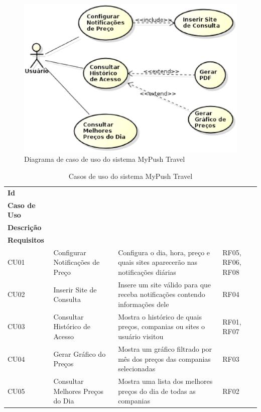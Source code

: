 \begin{figure}[H]
	\centering
	\includegraphics[scale=0.5]{figuras/caso_de_uso_mypush.eps}
	\caption{Diagrama de caso de uso do sistema MyPush Travel}
\end{figure}

\begin{table}[H]
	\centering
	\begin{tabular}{llll}
		\toprule
			\textbf{Id} & \\
			\textbf{Caso de Uso} & \\
			\textbf{Descrição} & \\
			\textbf{Requisitos} \\
		\midrule
			CU01 & Configurar Notificações de Preço & Configura o dia, hora, preço e quais sites aparecerão nas notificações diárias & RF05, RF06, RF08 \\ \hline
			CU02 & Inserir Site de Consulta & Insere um site válido para que receba notificações contendo informações dele & RF04 \\ \hline
			CU03 & Consultar Histórico de Acesso & Mostra o histórico de quais preços, companias ou sites o usuário visitou & RF01, RF07 \\ \hline
			CU04 & Gerar Gráfico do Preços & Mostra um gráfico filtrado por mês dos preços das companias selecionadas & RF03 \\ \hline
			CU05 & Consultar Melhores Preços do Dia & Mostra uma lista dos melhores preços do dia de todas as companias & RF02 \\ \hline
		\bottomrule
	\end{tabular}
	\caption{Casos de uso do sistema MyPush Travel}
	\label{tab03}
\end{table}